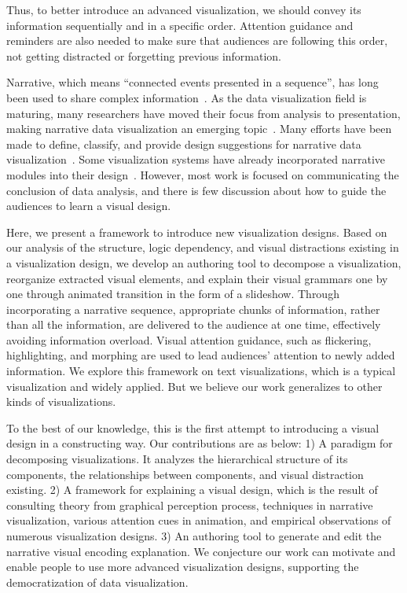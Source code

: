 Thus, to better introduce an advanced visualization, we should convey its information sequentially and in a specific order. Attention guidance and reminders are also needed to make sure that audiences are following this order, not getting distracted or forgetting previous information.

Narrative, which means ``connected events presented in a sequence'', has long been used to share complex information~\cite{schmidt_living_2017}. As the data visualization field is maturing, many researchers have moved their focus from analysis to presentation, making narrative data visualization an emerging topic~\cite{kosara_storytelling:_2013}. Many efforts have been
made to define, classify, and provide design suggestions for narrative data visualization~\cite{segel_narrative_2010,hullman_deeper_2013,gershon_what_2001}. Some visualization systems have already incorporated narrative modules into their design~\cite{eccles_stories_2007,bryan_temporal_2016}. However, most work is focused on communicating the conclusion of data analysis, and there is few discussion about how to guide the audiences to learn a visual design. 

Here, we present a framework to introduce new visualization designs. Based on our analysis of the structure, logic dependency, and visual distractions existing in a visualization design, we develop an authoring tool to decompose a visualization, reorganize extracted visual elements, and explain their visual grammars one by one through animated transition in the form of a slideshow. Through incorporating a narrative sequence, appropriate chunks of information, rather than all the information, are delivered to the audience at one time, effectively avoiding information overload. Visual attention guidance, such as flickering, highlighting, and morphing are used to lead audiences' attention to newly added information. We explore this framework on text visualizations, which is a typical visualization and widely applied. But we believe our work generalizes to other kinds of visualizations. 

To the best of our knowledge, this is the first attempt to introducing a visual design in a constructing way. Our contributions are as below: 1) A paradigm for decomposing visualizations. It analyzes the hierarchical structure of its components, the relationships between components, and visual distraction existing. 2) A framework for explaining a visual design, which is the result of consulting theory from graphical perception process, techniques in narrative visualization, various attention cues in animation, and empirical observations of numerous visualization designs. 3) An authoring tool to generate and edit the narrative visual encoding explanation.
 We conjecture our work can motivate and enable people to use more advanced visualization designs, supporting the democratization of data visualization.
 